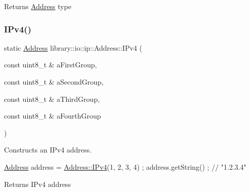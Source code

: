 \begin{DoxyReturn}{Returns}
\hyperlink{classlibrary_1_1io_1_1ip_1_1_address}{Address} type 
\end{DoxyReturn}
\mbox{\label{classlibrary_1_1io_1_1ip_1_1_address_a046ddcc0011c0301e2d52f2aaf2e4bca}} 
\subsubsection{\texorpdfstring{I\+Pv4()}{IPv4()}\hspace{0.1cm}{\footnotesize\ttfamily [1/2]}}
{\footnotesize\ttfamily static \hyperlink{classlibrary_1_1io_1_1ip_1_1_address}{Address} library\+::io\+::ip\+::\+Address\+::\+I\+Pv4 (\begin{DoxyParamCaption}\item[{const uint8\+\_\+t \&}]{a\+First\+Group,  }\item[{const uint8\+\_\+t \&}]{a\+Second\+Group,  }\item[{const uint8\+\_\+t \&}]{a\+Third\+Group,  }\item[{const uint8\+\_\+t \&}]{a\+Fourth\+Group }\end{DoxyParamCaption})\hspace{0.3cm}{\ttfamily [static]}}



Constructs an I\+Pv4 address. 


\begin{DoxyCode}
\hyperlink{classlibrary_1_1io_1_1ip_1_1_address_ab968d468b8bc2ba8f48fd2b6784832fe}{Address} address = \hyperlink{classlibrary_1_1io_1_1ip_1_1_address_a046ddcc0011c0301e2d52f2aaf2e4bca}{Address::IPv4}(1, 2, 3, 4) ;
address.getString() ; \textcolor{comment}{// "1.2.3.4"}
\end{DoxyCode}


\begin{DoxyReturn}{Returns}
I\+Pv4 address 
\end{DoxyReturn}
\mbox{\label{classlibrary_1_1io_1_1ip_1_1_address_a464ce60b6c4412f1b6515b4c0cb8d43d}} 
